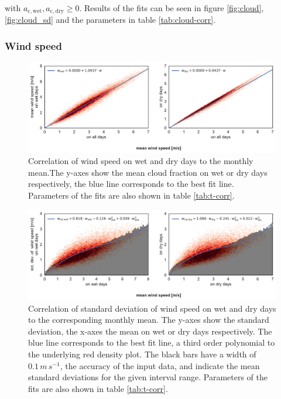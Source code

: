 \begin{refsection}
with $a_{\mathrm{c}, \mathrm{wet}}, a_{\mathrm{c}, \mathrm{dry}} \geq 0$. Results of the fits can be seen in figure \ref{fig:cloud}, \ref{fig:cloud_sd} and the parameters in table \ref{tab:cloud-corr}.


\subsubsection{Wind speed}
\begin{figure}
	\includegraphics[width=12cm]{Figures/f10.pdf}
	\caption[Correlation of wind speed on wet and dry days to the monthly mean]{Correlation of wind speed on wet and dry days to the monthly mean.The y-axes show the mean cloud fraction on wet or dry days respectively, the blue line corresponds to the best fit line. Parameters of the fits are also shown in table \ref{tab:t-corr}.}
	\label{fig:wind}
\end{figure}
\begin{figure}
	\includegraphics[width=12cm]{Figures/f11.pdf}
	\caption[Correlation of standard deviation of wind speed to the monthly mean]{Correlation of standard deviation of wind speed on wet and dry days to the corresponding monthly mean. The y-axes show the standard deviation, the x-axes the mean on wet or dry days respectively. The blue line corresponds to the best fit line, a third order polynomial to the underlying red density plot. The black bars have a width of $0.1\, \unit{m}\, \unit{s}^{-1}$, the accuracy of the input data, and indicate the mean standard deviations for the given interval range. Parameters of the fits are also shown in table \ref{tab:t-corr}.}
	\label{fig:wind_sd}
\end{figure}


\end{refsection}
